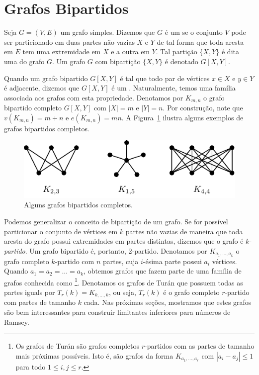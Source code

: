 \section{Grafos Bipartidos}

Seja $G = (V,E)$ um grafo simples. Dizemos que $G$ é um  se o conjunto $V$ pode ser particionado em duas partes não vazias $X$ e $Y$ de tal forma que toda aresta em $E$ tem uma extremidade em $X$ e a outra em $Y$. Tal partição $\{ X,Y \}$ é dita uma  do grafo $G$. Um grafo $G$ com bipartição $\{X,Y\}$ é denotado $G[X,Y]$.

Quando um grafo bipartido $G[X,Y]$ é tal que todo par de vértices $x \in X$ e $y \in Y$ é adjacente, dizemos que $G[X,Y]$ é um . Naturalmente, temos uma família associada aos grafos com esta propriedade. Denotamos por $K_{m,n}$ o grafo bipartido completo $G[X,Y]$ com $|X| = m$ e $|Y| = n$. Por construção, note que $v(K_{m,n}) = m + n$ e $e(K_{m,n}) = mn$. A Figura~\ref{graph:fig:part} ilustra alguns exemplos de grafos bipartidos completos.

\begin{figure}[ht!]
\centering
\includegraphics{figures/3_graph_1_part}
\caption{Alguns grafos bipartidos completos.}
\label{graph:fig:part}
\end{figure}

Podemos generalizar o conceito de bipartição de um grafo. Se for possível particionar o conjunto de vértices em $k$ partes não vazias de maneira que toda aresta do grafo possui extremidades em partes distintas, dizemos que o grafo é $k$-\emph{partido}. Um grafo bipartido é, portanto, 2-partido. Denotamos por $K_{a_1, \dots, a_k}$ o grafo completo $k$-partido com $n$ partes, cuja $i$-ésima parte possui $a_i$ vértices. Quando $a_1 = a_2 = \dots = a_k$, obtemos grafos que fazem parte de uma família de grafos conhecida como \footnote{Os grafos de Turán são grafos completos $r$-partidos com as partes de tamanho mais próximas possíveis. Isto é, são grafos da forma $K_{a_1, \dots, a_r}$ com $|a_i - a_j| \leq 1$ para todo $1 \leq i,j \leq r$.}.
Denotamos os grafos de Turán que possuem todas as partes iguals por $T_r(k) = K_{k, \dots, k}$, ou seja, $T_r(k)$ é o grafo completo $r$-partido com partes de tamanho $k$ cada. Nas próximas seções, mostramos que estes grafos são bem interessantes para construir limitantes inferiores para números de Ramsey.

